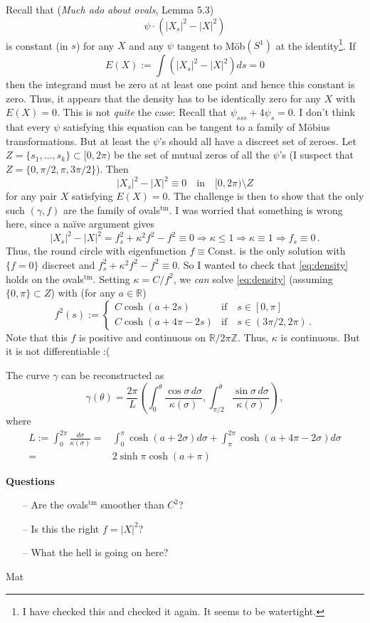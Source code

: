 \documentclass[12pt, a4paper]{amsart}
\theoremstyle{remark}
\begin{document}
Recall that (\emph{Much ado about ovals}, Lemma 5.3)
\[
\psi\cdot (|X_s|^2-|X|^2)
\]
is constant (in $s$) for any $X$ and any $\psi$ tangent to M\"ob$(S^1)$ at the identity\footnote{I have checked this and checked it again. It seems to be watertight.}. If 
\[
E(X):=\int(|X_s|^2-|X|^2)ds=0
\]
then the integrand must be zero at at least one point and hence this constant is zero. Thus, it appears that the density has to be identically zero for any $X$ with $E(X)=0$. This is not \emph{quite} the case: Recall that $\psi_{sss}+4\psi_s=0$. I don't think that every $\psi$ satisfying this equation can be tangent to a family of M\"obius transformations. But at least the $\psi$'s should all have a discreet set of zeroes. Let $Z=\{s_1,\dots,s_k\}\subset [0,2\pi)$ be the set of mutual zeros of all the $\psi$'s (I suspect that $Z=\{0,\pi/2,\pi,3\pi/2\}$). Then
\begin{equation}\label{eq:density}
|X_s|^2-|X|^2\equiv 0\quad \text{in}\quad [0,2\pi)\setminus Z
\end{equation}
for any pair $X$ satisfying $E(X)=0$. The challenge is then to show that the only such $(\gamma,f)$ are the family of ovals$^{\mathrm{tm}}$. I was worried that something is wrong here, since a na\"ive argument gives
\[
|X_s|^2-|X|^2=f_s^2+\kappa^2 f^2-f^2\equiv 0\Rightarrow \kappa\leq 1\Rightarrow \kappa\equiv 1\Rightarrow f_s\equiv 0\,.
\]
Thus, the round circle with eigenfunction $f\equiv \mathrm{Const.}$ is the only solution with $\{f=0\}$ discreet and $f_s^2+\kappa^2 f^2-f^2\equiv 0$. So I wanted to check that \eqref{eq:density} holds on the ovals$^{\mathrm{tm}}$. Setting $\kappa=C/f^2$, we \emph{can} solve \eqref{eq:density} (assuming $\{0,\pi\}\subset Z$) with (for any $a\in\mathbb{R}$)
\[
f^2(s):=
\begin{cases}
C\cosh(a+2s)&\text{if}\quad s\in[0,\pi]\\
C\cosh(a+4\pi-2s)&\text{if}\quad s\in(3\pi/2,2\pi)\,.
\end{cases}
\]
Note that this $f$ is positive and continuous on $\mathbb{R}/2\pi\mathbb{Z}$. Thus, $\kappa$ is continuous. But it is not differentiable :(

The curve $\gamma$ can be reconstructed as
\[
\gamma(\theta)=\frac{2\pi}{L}\left(\int_0^\theta\frac{\cos\sigma\,d\sigma}{\kappa(\sigma)},\int_{\pi/2}^\theta\frac{\sin\sigma\,d\sigma}{\kappa(\sigma)}\right)\,,
\]
where
\begin{align*}
L:=\int_0^{2\pi}\frac{d\sigma}{\kappa(\sigma)}={}& \int_0^{\pi}\cosh(a+2\sigma)d\sigma+\int_\pi^{2\pi}\cosh(a+4\pi-2\sigma)d\sigma\\
={}&2\sinh \pi \cosh(a+\pi)
\end{align*}

\textbf{Questions}
\begin{itemize}
\item[--] Are the ovals$^{\mathrm{tm}}$ smoother than $C^2$? 
\item[--] Is this the right $f=|X|^2$?
\item[--] What the hell is going on here?
\end{itemize}

\bigskip

Mat
\end{document}
